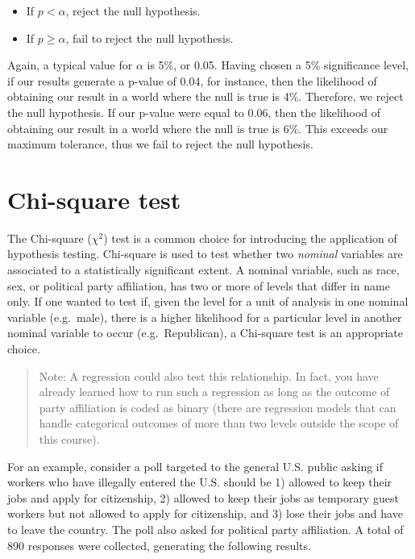 \documentclass[
]{book}
\providecommand{\tightlist}{%
  \setlength{\itemsep}{0pt}\setlength{\parskip}{0pt}}
\begin{document}
\begin{itemize}
\tightlist
\item
  If \(p<\alpha\), reject the null hypothesis.
\item
  If \(p\geq \alpha\), fail to reject the null hypothesis.
\end{itemize}

Again, a typical value for \(\alpha\) is 5\%, or 0.05. Having chosen a 5\% significance level, if our results generate a p-value of 0.04, for instance, then the likelihood of obtaining our result in a world where the null is true is 4\%. Therefore, we reject the null hypothesis. If our p-value were equal to 0.06, then the likelihood of obtaining our result in a world where the null is true is 6\%. This exceeds our maximum tolerance, thus we fail to reject the null hypothesis.

\hypertarget{chi-square-test}{%
\section{Chi-square test}\label{chi-square-test}}

The Chi-square (\(\chi^2\)) test is a common choice for introducing the application of hypothesis testing. Chi-square is used to test whether two \emph{nominal} variables are associated to a statistically significant extent. A nominal variable, such as race, sex, or political party affiliation, has two or more of levels that differ in name only. If one wanted to test if, given the level for a unit of analysis in one nominal variable (e.g.~male), there is a higher likelihood for a particular level in another nominal variable to occur (e.g.~Republican), a Chi-square test is an appropriate choice.

\begin{quote}
Note: A regression could also test this relationship. In fact, you have already learned how to run such a regression as long as the outcome of party affiliation is coded as binary (there are regression models that can handle categorical outcomes of more than two levels outside the scope of this course).
\end{quote}

For an example, consider a poll targeted to the general U.S. public asking if workers who have illegally entered the U.S. should be 1) allowed to keep their jobs and apply for citizenship, 2) allowed to keep their jobs as temporary guest workers but not allowed to apply for citizenship, and 3) lose their jobs and have to leave the country. The poll also asked for political party affiliation. A total of 890 responses were collected, generating the following results.
\end{document}
